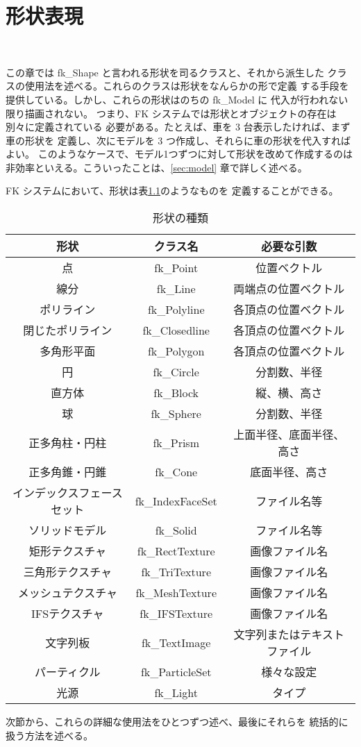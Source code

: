 \chapter{形状表現} \label{sec:shape} ~

この章では fk\_Shape と言われる形状を司るクラスと、それから派生した
クラスの使用法を述べる。これらのクラスは形状をなんらかの形で定義
する手段を提供している。しかし、これらの形状はのちの fk\_Model に
代入が行われない限り描画されない。
つまり、FK システムでは形状とオブジェクトの存在は別々に定義されている
必要がある。たとえば、車を 3 台表示したければ、まず車の形状を
定義し、次にモデルを 3 つ作成し、それらに車の形状を代入すればよい。
このようなケースで、モデル1つずつに対して形状を改めて作成するのは
非効率といえる。こういったことは、\ref{sec:model} 章で詳しく述べる。

FK システムにおいて、形状は表\ref{tbl:fkShape1}のようなものを
定義することができる。

\begin{table}[H]
\caption{形状の種類}
\label{tbl:fkShape1}
\begin{center}
\begin{tabular}{|c|c|c|}
\hline
形状 & クラス名 & 必要な引数 \\ \hline \hline
点 & fk\_Point & 位置ベクトル \\ \hline
線分 & fk\_Line & 両端点の位置ベクトル \\ \hline
ポリライン & fk\_Polyline & 各頂点の位置ベクトル \\ \hline
閉じたポリライン & fk\_Closedline & 各頂点の位置ベクトル \\ \hline
多角形平面 & fk\_Polygon & 各頂点の位置ベクトル \\ \hline
円 & fk\_Circle & 分割数、半径 \\ \hline
直方体 & fk\_Block & 縦、横、高さ \\ \hline
球 & fk\_Sphere & 分割数、半径 \\ \hline
正多角柱・円柱 & fk\_Prism & 上面半径、底面半径、高さ \\ \hline
正多角錐・円錐 & fk\_Cone & 底面半径、高さ \\ \hline
インデックスフェースセット & fk\_IndexFaceSet & ファイル名等 \\ \hline
ソリッドモデル & fk\_Solid & ファイル名等 \\ \hline
矩形テクスチャ & fk\_RectTexture & 画像ファイル名 \\ \hline
三角形テクスチャ & fk\_TriTexture & 画像ファイル名 \\ \hline
メッシュテクスチャ & fk\_MeshTexture & 画像ファイル名 \\ \hline
IFSテクスチャ & fk\_IFSTexture & 画像ファイル名 \\ \hline
文字列板 & fk\_TextImage & 文字列またはテキストファイル \\ \hline
パーティクル & fk\_ParticleSet & 様々な設定 \\ \hline
光源 & fk\_Light & タイプ \\ \hline
\end{tabular}
\end{center}
\end{table}
次節から、これらの詳細な使用法をひとつずつ述べ、最後にそれらを
統括的に扱う方法を述べる。
